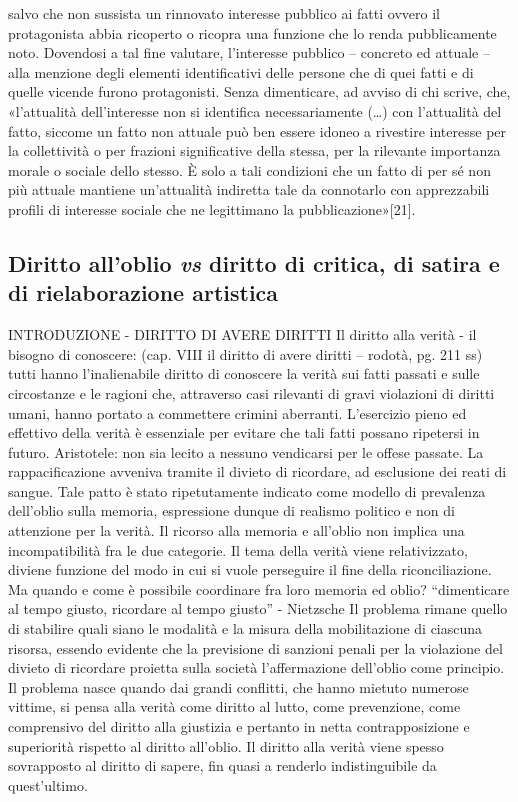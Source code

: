salvo che non sussista un rinnovato interesse pubblico ai fatti ovvero il protagonista abbia ricoperto o ricopra una funzione che lo renda pubblicamente noto. Dovendosi a tal fine valutare, l’interesse pubblico – concreto ed attuale – alla menzione degli elementi identificativi delle persone che di quei fatti e di quelle vicende furono protagonisti. Senza dimenticare, ad avviso di chi scrive, che, «l’attualità dell’interesse non si identifica necessariamente (…) con l’attualità del fatto, siccome un fatto non attuale può ben essere idoneo a rivestire interesse per la collettività o per frazioni significative della stessa, per la rilevante importanza morale o sociale dello stesso. È solo a tali condizioni che un fatto di per sé non più attuale mantiene un’attualità indiretta tale da connotarlo con apprezzabili profili di interesse sociale che ne legittimano la pubblicazione»[21].

\subsection{Diritto all'oblio \textit{vs} diritto di critica, di satira e di rielaborazione artistica}

INTRODUZIONE - DIRITTO DI AVERE DIRITTI
Il diritto alla verità - il bisogno di conoscere: (cap. VIII il diritto di avere diritti – rodotà, pg. 211 ss)
tutti hanno l’inalienabile diritto di conoscere la verità sui fatti passati e sulle circostanze e le ragioni che, attraverso casi rilevanti di gravi violazioni di diritti umani, hanno portato a commettere crimini aberranti. L’esercizio pieno ed effettivo della verità è essenziale per evitare che tali fatti possano ripetersi in futuro.
Aristotele: non sia lecito a nessuno vendicarsi per le offese passate. La rappacificazione avveniva tramite il divieto di ricordare, ad esclusione dei reati di sangue.
Tale patto è stato ripetutamente indicato come modello di prevalenza dell’oblio sulla memoria, espressione dunque di realismo politico e non di attenzione per la verità. Il ricorso alla memoria e all’oblio non implica una incompatibilità fra le due categorie. Il tema della verità viene relativizzato, diviene funzione del modo in cui si vuole perseguire il fine della riconciliazione. Ma quando e come è possibile coordinare fra loro memoria ed oblio?
“dimenticare al tempo giusto, ricordare al tempo giusto”  - Nietzsche
Il problema rimane quello di stabilire quali siano le modalità e la misura della mobilitazione di ciascuna risorsa, essendo evidente che la previsione di sanzioni penali per la violazione del divieto di ricordare proietta sulla società l’affermazione dell’oblio come principio.
Il problema nasce quando dai grandi conflitti, che hanno mietuto numerose vittime, si pensa alla verità come diritto al lutto, come prevenzione, come comprensivo del diritto alla giustizia e pertanto in netta contrapposizione e superiorità rispetto al diritto all’oblio. Il diritto alla verità viene spesso sovrapposto al diritto di sapere, fin quasi a renderlo indistinguibile da quest’ultimo. 


